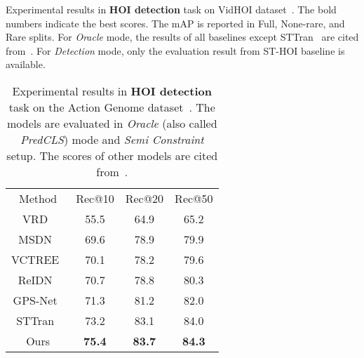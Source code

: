 \documentclass[times,twocolumn,final,authoryear]{elsarticle}
\begin{document}
\begin{table}
    \caption{Experimental results in \textbf{HOI detection} task on VidHOI dataset~\citep{hoi_v_set:VidHOI}. The bold numbers indicate the best scores. The mAP is reported in Full, None-rare, and Rare splits. For \textit{Oracle} mode, the results of all baselines except STTran~\citep{hoi_v2:sttran} are cited from~\citep{hoi_v2:tubelet_tokens}. For \textit{Detection} mode, only the evaluation result from ST-HOI baseline is available.}
    \label{table:detection}
\end{table}

\begin{table}
    \centering
    \small
    \begin{tabular}{|c|c c c|}
       \hline
       Method & Rec@10 & Rec@20 & Rec@50 \\
       \hhline{|=|= = =|}
       VRD~\citep{hoi_i2:language_prior} & 55.5 & 64.9 & 65.2 \\
       MSDN~\citep{hoi_i2:msdn} & 69.6 & 78.9 & 79.9 \\
       VCTREE~\citep{hoi_i2:vctree} & 70.1 & 78.2 & 79.6 \\
       ReIDN~\citep{hoi_i2:reidn} & 70.7 & 78.8 & 80.3 \\
       GPS-Net~\citep{hoi_i2:gpsnet} & 71.3 & 81.2 & 82.0 \\
       STTran~\citep{hoi_v2:sttran} & 73.2 & 83.1 & 84.0 \\
       Ours & \textbf{75.4} & \textbf{83.7} & \textbf{84.3} \\ 
       \hline
    \end{tabular}

    \caption{Experimental results in \textbf{HOI detection} task on the Action Genome dataset~\citep{hoi_v_set:action_genome}. The models are evaluated in \emph{Oracle} (also called \emph{PredCLS}) mode and \emph{Semi Constraint} setup. The scores of other models are cited from~\citep{hoi_v2:sttran}. }
    \label{table:ag}
\end{table}
\end{document}

